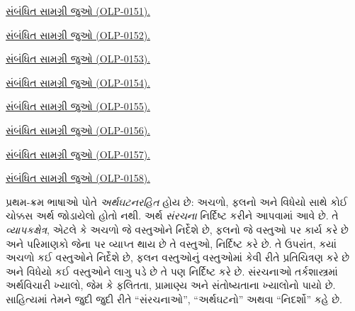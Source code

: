 \begingroup
\makeatletter{}\makeatother
\noindent\hyperref[guunit:OLP-0151]{સંબંધિત સામગ્રી જુઓ (OLP-0151).}\par
\endgroup


\begingroup
\makeatletter{}\makeatother
\noindent\hyperref[guunit:OLP-0152]{સંબંધિત સામગ્રી જુઓ (OLP-0152).}\par
\endgroup


\begingroup
\makeatletter{}\makeatother
\noindent\hyperref[guunit:OLP-0153]{સંબંધિત સામગ્રી જુઓ (OLP-0153).}\par
\endgroup


\begingroup
\makeatletter{}\makeatother
\noindent\hyperref[guunit:OLP-0154]{સંબંધિત સામગ્રી જુઓ (OLP-0154).}\par
\endgroup


\begingroup
\makeatletter{}\makeatother
\noindent\hyperref[guunit:OLP-0155]{સંબંધિત સામગ્રી જુઓ (OLP-0155).}\par
\endgroup


\begingroup
\makeatletter{}\makeatother
\noindent\hyperref[guunit:OLP-0156]{સંબંધિત સામગ્રી જુઓ (OLP-0156).}\par
\endgroup


\begingroup
\makeatletter{}\makeatother
\noindent\hyperref[guunit:OLP-0157]{સંબંધિત સામગ્રી જુઓ (OLP-0157).}\par
\endgroup


\begingroup
\makeatletter{}\makeatother
\noindent\hyperref[guunit:OLP-0158]{સંબંધિત સામગ્રી જુઓ (OLP-0158).}\par
\endgroup


\begingroup
\makeatletter{}\makeatother


\label{guunit:OLP-0161}


\begin{explain}
પ્રથમ-ક્રમ ભાષાઓ પોતે
\emph{અર્થઘટનરહિત} હોય છે: અચળો, ફલનો અને
વિધેયો સાથે કોઈ ચોક્કસ અર્થ જોડાયેલો હોતો નથી. અર્થ
 \emph{સંરચના} નિર્દિષ્ટ કરીને આપવામાં આવે
છે. તે \emph{વ્યાપકક્ષેત્ર}, એટલે કે અચળો જે વસ્તુઓને નિર્દેશે છે,
ફલનો જે વસ્તુઓ પર કાર્ય કરે છે અને પરિમાણકો જેના પર વ્યાપ્ત
થાય છે તે વસ્તુઓ, નિર્દિષ્ટ કરે છે. તે ઉપરાંત, કયાં અચળો કઈ
વસ્તુઓને નિર્દેશે છે, ફલન વસ્તુઓનું વસ્તુઓમાં કેવી રીતે
પ્રતિચિત્રણ કરે છે અને વિધેયો કઈ વસ્તુઓને લાગુ પડે છે તે પણ
નિર્દિષ્ટ કરે છે. સંરચનાઓ તર્કશાસ્ત્રમાં અર્થવિચારી ખ્યાલો,
જેમ કે ફલિતતા, પ્રામાણ્ય અને સંતોષ્યતાના ખ્યાલોનો પાયો છે. સાહિત્યમાં
તેમને જુદી જુદી રીતે ``સંરચનાઓ'', ``અર્થઘટનો'' અથવા ``નિદર્શો'' કહે
છે.
\end{explain}

